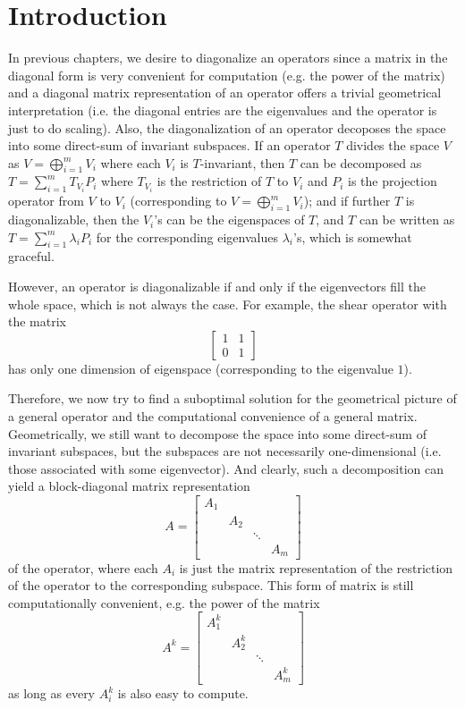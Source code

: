 \documentclass{article}
\begin{document}
\section{Introduction}
In previous chapters, we desire to diagonalize an operators since a matrix in the diagonal form is very convenient for computation (e.g. the power of the matrix) and a diagonal matrix representation of an operator offers a trivial geometrical interpretation (i.e. the diagonal entries are the eigenvalues and the operator is just to do scaling). Also, the diagonalization of an operator decoposes the space into some direct-sum of invariant subspaces. If an operator $T$ divides the space $V$ as $V = \bigoplus_{i=1}^m V_i$ where each $V_i$ is $T$-invariant, then $T$ can be decomposed as $T = \sum_{i=1}^{m} T_{V_i}P_i$ where $T_{V_i}$ is the restriction of $T$ to $V_i$ and $P_i$ is the projection operator from $V$ to $V_i$ (corresponding to $V = \bigoplus_{i=1}^m V_i$); and if further $T$ is diagonalizable, then the $V_i$'s can be the eigenspaces of $T$, and $T$ can be written as $T = \sum_{i=1}^{m} \lambda_i P_i$ for the corresponding eigenvalues $\lambda_i$'s, which is somewhat graceful.

However, an operator is diagonalizable if and only if the eigenvectors fill the whole space, which is not always the case. For example, the shear operator with the matrix
$$
\begin{bmatrix}
    1 & 1 \\
    0 & 1
\end{bmatrix}
$$
has only one dimension of eigenspace (corresponding to the eigenvalue $1$).

Therefore, we now try to find a suboptimal solution for the geometrical picture of a general operator and the computational convenience of a general matrix. Geometrically, we still want to decompose the space into some direct-sum of invariant subspaces, but the subspaces are not necessarily one-dimensional (i.e. those associated with some eigenvector). And clearly, such a decomposition can yield a block-diagonal matrix representation
$$ A = 
\begin{bmatrix}
    A_1 & & & \\
    & A_2 & & \\
    & & \ddots & \\
    & & & A_m
\end{bmatrix}
$$
of the operator, where each $A_i$ is just the matrix representation of the restriction of the operator to the corresponding subspace. This form of matrix is still computationally convenient, e.g. the power of the matrix
$$ A^k = 
\begin{bmatrix}
    A_1^k & & & \\
    & A_2^k & & \\
    & & \ddots & \\
    & & & A_m^k
\end{bmatrix}
$$
as long as every $A_i^k$ is also easy to compute. 
\end{document}
